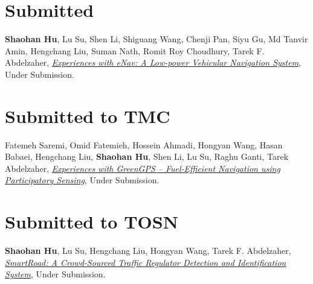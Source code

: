 
\section{\sc Submitted}\hypertarget{hu2015mobisys}{}
\textbf{Shaohan Hu}, Lu Su, Shen Li, Shiguang Wang, Chenji Pan, Siyu Gu, Md Tanvir Amin,
Hengchang Liu, Suman Nath, Romit Roy Choudhury, Tarek F. Abdelzaher, \href{}{\emph{Experiences with eNav: A Low-power Vehicular Navigation System}}, \textsf{Under Submission}.


\section{\sc Submitted to TMC}\hypertarget{saremi2014tmc}{}
Fatemeh Saremi, Omid Fatemieh, Hossein Ahmadi, Hongyan Wang, Hasan Babaei, Hengchang Liu, \textbf{Shaohan Hu}, Shen Li, Lu Su, Raghu Ganti, Tarek Abdelzaher, \href{}{\emph{Experiences with GreenGPS -- Fuel-Efficient Navigation using Participatory Sensing}}, \textsf{Under Submission}.%

\section{\sc Submitted to TOSN}\hypertarget{hu2013tosn}{}
\textbf{Shaohan Hu}, Lu Su, Hengchang Liu, Hongyan Wang, Tarek F.
Abdelzaher, \href{}{\emph{SmartRoad: A Crowd-Sourced Traffic
  Regulator Detection and Identification System}}, \textsf{Under Submission}.%
